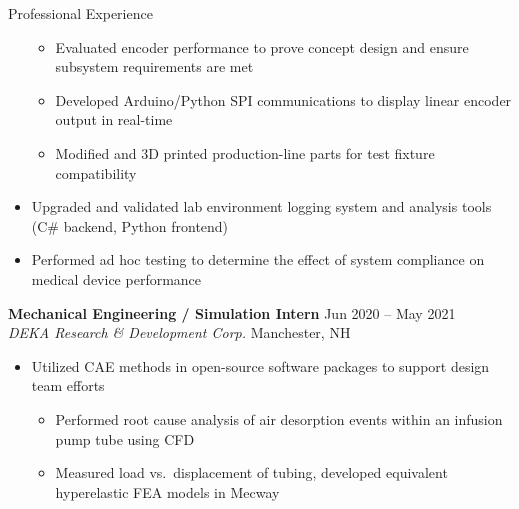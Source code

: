 \documentclass{resume}
\begin{document}
\begin{rSection}{Professional Experience}
\begin{itemize}[label={\tiny\raisebox{1ex}{\textbullet}}, noitemsep]
              \begin{itemize}[label={\tiny\raisebox{1ex}{\textbullet}}, noitemsep]
                  \item Evaluated encoder performance to prove concept design and ensure subsystem requirements are met
                  \item Developed Arduino/Python SPI communications to display linear encoder output in real-time
                  \item Modified and 3D printed production-line parts for test fixture compatibility
              \end{itemize}
        \item Upgraded and validated lab environment logging system and analysis tools (C\# backend, Python frontend)
        \item Performed ad hoc testing to determine the effect of system compliance on medical device performance
    \end{itemize}
    \vspace{-0.4em}
    {\textbf{Mechanical Engineering / Simulation Intern}} \hfill {Jun 2020 -- May 2021}
    \\ {\em DEKA Research \& Development Corp.} \hfill {Manchester, NH}
    \vspace{-0.5em}
    \begin{itemize}[label={\tiny\raisebox{1ex}{\textbullet}}, noitemsep]
        \item Utilized CAE methods in open-source software packages to support design team efforts
              \begin{itemize}[label={\tiny\raisebox{1ex}{\textbullet}}, noitemsep]
                  \item Performed root cause analysis of air desorption events within an infusion pump tube using CFD
                  \item Measured load vs.\ displacement of tubing, developed equivalent hyperelastic FEA models in Mecway
              \end{itemize}{}
    \end{itemize}{}
    \vspace{-0.4em}
\end{rSection}
\end{document}
